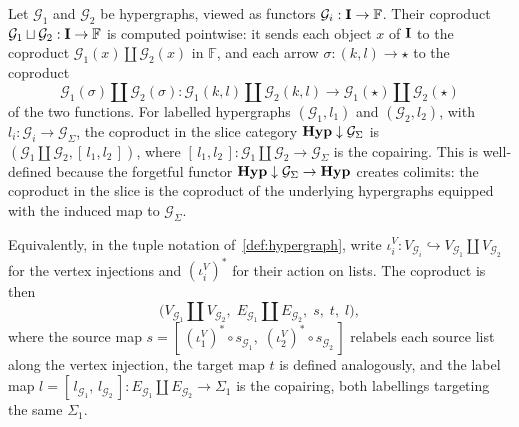 \begin{definition}[Coproduct]
Let $\mathcal{G}_1$ and $\mathcal{G}_2$ be hypergraphs, viewed as functors $\mathcal{G}_i : \mathbf{I} \to \mathbb{F}$.
Their coproduct $\mathcal{G}_1 \sqcup \mathcal{G}_2 : \mathbf{I} \to \mathbb{F}$ is computed pointwise: it sends each object $x$ of $\mathbf{I}$ to the coproduct $\mathcal{G}_1(x) \coprod \mathcal{G}_2(x)$ in $\mathbb{F}$, and each arrow $\sigma : (k,l) \to \star$ to the coproduct
\[
\mathcal{G}_1(\sigma) \coprod \mathcal{G}_2(\sigma) : \mathcal{G}_1(k,l) \coprod \mathcal{G}_2(k,l) \longrightarrow \mathcal{G}_1(\star) \coprod \mathcal{G}_2(\star)
\]
of the two functions.
For labelled hypergraphs $(\mathcal{G}_1, l_1)$ and $(\mathcal{G}_2, l_2)$, with $l_i : \mathcal{G}_i \to \mathcal{G}_{\Sigma}$, the coproduct in the slice category $\mathbf{Hyp} \downarrow \mathcal{G}_{\Sigma}$ is $(\mathcal{G}_1 \coprod \mathcal{G}_2, [\,l_1, l_2\,])$, where $[\,l_1, l_2\,] : \mathcal{G}_1 \coprod \mathcal{G}_2 \to \mathcal{G}_{\Sigma}$ is the copairing.
This is well-defined because the forgetful functor $\mathbf{Hyp} \downarrow \mathcal{G}_{\Sigma} \to \mathbf{Hyp}$ creates colimits: the coproduct in the slice is the coproduct of the underlying hypergraphs equipped with the induced map to $\mathcal{G}_{\Sigma}$.

Equivalently, in the tuple notation of~\cref{def:hypergraph}, write $\iota^V_i : V_{\mathcal{G}_i} \hookrightarrow V_{\mathcal{G}_1} \coprod V_{\mathcal{G}_2}$ for the vertex injections and $(\iota^V_i)^{*}$ for their action on lists.
The coproduct is then
\[
\bigl(V_{\mathcal{G}_1} \coprod V_{\mathcal{G}_2},\; E_{\mathcal{G}_1} \coprod E_{\mathcal{G}_2},\; s,\; t,\; l\bigr),
\]
where the source map $s = [\,(\iota^V_1)^{*} \circ s_{\mathcal{G}_1},\; (\iota^V_2)^{*} \circ s_{\mathcal{G}_2}\,]$ relabels each source list along the vertex injection, the target map $t$ is defined analogously, and the label map $l = [\,l_{\mathcal{G}_1},\, l_{\mathcal{G}_2}\,] : E_{\mathcal{G}_1} \coprod E_{\mathcal{G}_2} \to \Sigma_1$ is the copairing, both labellings targeting the same $\Sigma_1$.
\end{definition}


